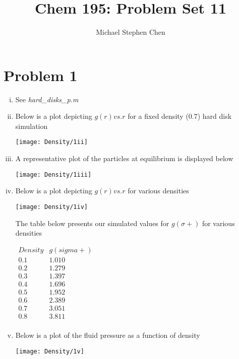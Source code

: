 \documentclass{article}
\title{Chem 195: Problem Set 11}
\author{Michael Stephen Chen}
\begin{document}
\maketitle
\pagebreak

\section*{Problem 1}
\begin{enumerate}[i.]
  \item See \textit{hard\_disks\_p.m}
  \item Below is a plot depicting $g(r) vs. r$ for a fixed density (0.7) hard disk simulation
    \begin{center}
      \texttt{[image: Density/1ii]}
    \end{center}

  \item A representative plot of the particles at equilibrium is displayed below
    \begin{center}
      \texttt{[image: Density/1iii]}
    \end{center}

  \item Below is a plot depicting $g(r) vs. r$ for various densities
    \begin{center}
      \texttt{[image: Density/1iv]}
    \end{center}

    The table below presents our simulated values for $g(\sigma +)$ for various densities
    \begin{center}
      $\begin{array}{c|c}
        Density & g(sigma+) \\ \hline
        0.1 & 1.010 \\
        0.2 & 1.279 \\
        0.3 & 1.397 \\
        0.4 & 1.696 \\
        0.5 & 1.952 \\
        0.6 & 2.389 \\
        0.7 & 3.051 \\
        0.8 & 3.811 \\
      \end{array}$
    \end{center}

  \item Below is a plot of the fluid pressure as a function of density
    \begin{center}
      \texttt{[image: Density/1v]}
    \end{center}


\end{enumerate}
\end{document}
